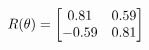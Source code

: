 \documentclass[preview]{standalone}
\begin{document}
\begin{align*}
\special{dvisvgm:raw <g id='unique000'>}R(\theta) = \begin{bmatrix}0.81 & 0.59\\-0.59 & 0.81\end{bmatrix}\special{dvisvgm:raw </g>}
\end{align*}
\end{document}

